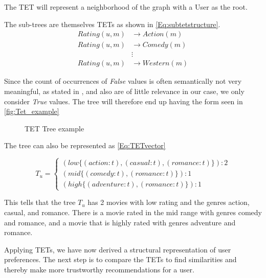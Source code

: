 The TET will represent a neighborhood of the graph with a User as the root.

The sub-trees are themselves TETs as shown in \autoref{Eq:subtetstructure}.
\begin{equation}\label{Eq:subtetstructure}
\begin{aligned}
Rating(u,m)& \longrightarrow Action(m) \\
Rating(u,m)& \longrightarrow Comedy(m)\\
& \vdots \\
Rating(u,m)& \longrightarrow Western(m)
\end{aligned}
\end{equation}

Since the count of occurrences of \textit{False} values is often semantically not very meaningful, as stated in \cite{jaeger2019counts}, and also are of little relevance in our case, we only consider \textit{True} values. The tree will therefore end up having the form seen in \autoref{fig:Tet_example}

\begin{figure}[H]
    \centering
    \begin{adjustbox}{width=0.5\textwidth}
    
    \end{adjustbox}
    \caption{TET Tree example}
    \label{fig:Tet_example}
\end{figure}


The tree can also be represented as \autoref{Eq:TETvector}

\begin{equation}\label{Eq:TETvector}
    T_u=
    \begin{cases}
      (low \{(action:t),(casual:t), (romance:t)\}):2 \\
      (mid \{(comedy:t),(romance:t)\}):1 \\
      (high\{(adventure:t),(romance:t)\}):1
    \end{cases}
\end{equation}

This tells that the tree $T_u$ has 2 movies with low rating and the genres action, casual, and romance. There is a movie rated in the mid range with genres comedy and romance, and a movie that is highly rated with genres adventure and romance.

Applying TETs, we have now derived a structural representation of user preferences. The next step is to compare the TETs to find similarities and thereby make more trustworthy recommendations for a user.
